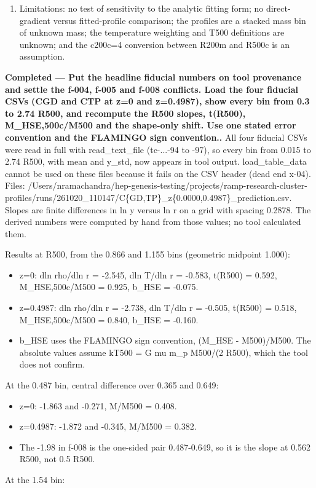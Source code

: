 \documentclass[11pt,a4paper]{article}
\begin{document}
\begin{enumerate}
  \item Limitations: no test of sensitivity to the analytic fitting form; no direct-gradient versus fitted-profile comparison; the profiles are a stacked mass bin of unknown mass; the temperature weighting and T500 definitions are unknown; and the c200c=4 conversion between R200m and R500c is an assumption.
\end{enumerate}
\textbf{Completed --- Put the headline fiducial numbers on tool provenance and settle the f-004, f-005 and f-008 conflicts. Load the four fiducial CSVs (CGD and CTP at z=0 and z=0.4987), show every bin from 0.3 to 2.74 R500, and recompute the R500 slopes, t(R500), M\_HSE,500c/M500 and the shape-only shift. Use one stated error convention and the FLAMINGO sign convention..} All four fiducial CSVs were read in full with read\_text\_file (tc-...-94 to -97), so every bin from 0.015 to 2.74 R500, with mean and y\_std, now appears in tool output. load\_table\_data cannot be used on these files because it fails on the CSV header (dead end x-04). Files: /Users/nramachandra/hep-genesis-testing/projects/ramp-research-cluster-profiles/runs/261020\_110147/C\{GD,TP\}\_z\{0.0000,0.4987\}\_prediction.csv. Slopes are finite differences in ln y versus ln r on a grid with spacing 0.2878. The derived numbers were computed by hand from those values; no tool calculated them.

Results at R500, from the 0.866 and 1.155 bins (geometric midpoint 1.000):

\begin{itemize}
  \item z=0: dln rho/dln r = -2.545, dln T/dln r = -0.583, t(R500) = 0.592, M\_HSE,500c/M500 = 0.925, b\_HSE = -0.075.
  \item z=0.4987: dln rho/dln r = -2.738, dln T/dln r = -0.505, t(R500) = 0.518, M\_HSE,500c/M500 = 0.840, b\_HSE = -0.160.
  \item b\_HSE uses the FLAMINGO sign convention, (M\_HSE - M500)/M500. The absolute values assume kT500 = G mu m\_p M500/(2 R500), which the tool does not confirm.
\end{itemize}
At the 0.487 bin, central difference over 0.365 and 0.649:

\begin{itemize}
  \item z=0: -1.863 and -0.271, M/M500 = 0.408.
  \item z=0.4987: -1.872 and -0.345, M/M500 = 0.382.
  \item The -1.98 in f-008 is the one-sided pair 0.487-0.649, so it is the slope at 0.562 R500, not 0.5 R500.
\end{itemize}
At the 1.54 bin:
\end{document}
